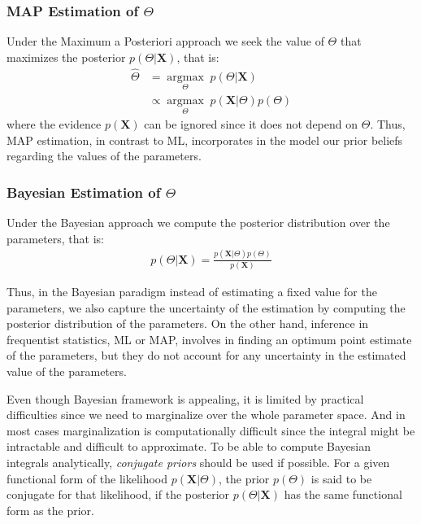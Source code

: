 \subsubsection*{MAP Estimation of $\Theta$}
Under the Maximum a Posteriori approach we seek the value of $\Theta$ that maximizes the posterior $p(\Theta | \mathbf{X})$, that is:
\begin{equation} \label{MAP-f-bayes}
  \begin{aligned}
	\hat{\Theta} & =  \underset{\Theta}{\operatorname{argmax}} \; p(\Theta | \mathbf{X}) \\
	& \propto \underset{\Theta}{\operatorname{argmax}} \; p(\mathbf{X}|\Theta) p(\Theta)
  \end{aligned}
\end{equation}
where the evidence $p(\mathbf{X})$ can be ignored since it does not depend on $\Theta$. Thus, MAP estimation, in contrast to ML, incorporates in the model our prior beliefs regarding the values of the parameters.

\subsubsection*{Bayesian Estimation of $\Theta$}
Under the Bayesian approach we compute the posterior distribution over the parameters, that is:
\begin{equation} \label{posterio-f-bayes}
  \begin{aligned}
	p(\Theta | \mathbf{X}) = \frac{p(\mathbf{X}|\Theta) p(\Theta)}{p(\mathbf{X})} 
  \end{aligned}
\end{equation}

Thus, in the Bayesian paradigm instead of estimating a fixed value for the parameters, we also capture the uncertainty of the estimation by computing the posterior distribution of the parameters. On the other hand, inference in frequentist statistics, \eg ML or MAP, involves in finding an optimum point estimate of the parameters, but they do not account for any uncertainty in the estimated value of the parameters. 

Even though Bayesian framework is appealing, it is limited by practical difficulties since we need to marginalize over the whole parameter space. And in most cases marginalization is computationally difficult since the integral might be intractable and difficult to approximate. To be able to compute Bayesian integrals analytically, \emph{conjugate priors} should be used if possible. For a given functional form of the likelihood $p(\mathbf{X}|\Theta)$, the prior $p(\Theta)$ is said to be conjugate for that likelihood, if the posterior $p(\Theta|\mathbf{X})$ has the same functional form as the prior.

